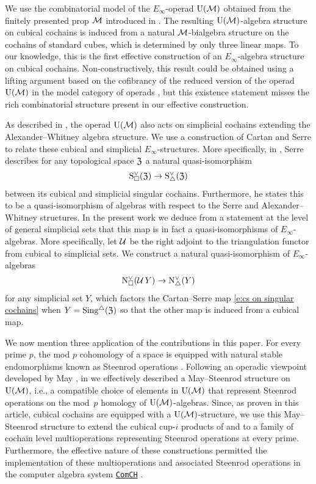 We use the combinatorial model of the $E_\infty$-operad ${\operatorname{U}(\mathcal{M})}$ obtained from the finitely presented prop $\mathcal{M}$ introduced in \cite{medina2020prop1}.
The resulting ${\operatorname{U}(\mathcal{M})}$-algebra structure on cubical cochains is induced from a natural $\mathcal{M}$-bialgebra structure on the cochains of standard cubes, which is determined by only three linear maps.
To our knowledge, this is the first effective construction of an $E_\infty$-algebra structure on cubical cochains.
Non-constructively, this result could be obtained using a lifting argument based on the cofibrancy of the reduced version of the operad ${\operatorname{U}(\mathcal{M})}$ in the model category of operads \cite{hinich1997homological, berger2003modelcategory}, but this existence statement misses the rich combinatorial structure present in our effective construction.

As described in \cite{medina2020prop1}, the operad ${\operatorname{U}(\mathcal{M})}$ also acts on simplicial cochains extending the Alexander--Whitney algebra structure.
We use a construction of Cartan and Serre to relate these cubical and simplicial $E_\infty$-structures.
More specifically, in \cite[p. 442]{serre1951homologie}, Serre describes for any topological space $\mathfrak{Z}$ a natural quasi-isomorphism
\begin{equation} \label{e:cs on singular cochains}
	\operatorname{S^{\vee}_{\square}}(\mathfrak{Z}) \to \operatorname{S^{\vee}_{\triangle}}(\mathfrak{Z})
\end{equation}
between its cubical and simplicial singular cochains.
Furthermore, he states this to be a quasi-isomorphism of algebras with respect to the Serre and Alexander--Whitney structures.
In the present work we deduce from a statement at the level of general simplicial sets that this map is in fact a quasi-isomorphisms of $E_\infty$-algebras.
More specifically, let $\operatorname{\mathcal{U}}$ be the right adjoint to the triangulation functor from cubical to simplicial sets.
We construct a natural quasi-isomorphism of $E_\infty$-algebras
\[
\operatorname{N^{\vee}_{\square}}(\operatorname{\mathcal{U}} Y) \to \operatorname{N^{\vee}_{\triangle}}(Y)
\]
for any simplicial set $Y$, which factors the Cartan--Serre map \eqref{e:cs on singular cochains} when $Y = \operatorname{Sing^{\triangle}}(\mathfrak{Z})$ so that the other map is induced from a cubical map.

We now mention three application of the contributions in this paper.
For every prime $p$, the mod $p$ cohomology of a space is equipped with natural stable endomorphisms known as Steenrod operations \cite{steenrod1962cohomology}.
Following an operadic viewpoint developed by May \cite{may1970general}, in \cite{medina2021may_st} we effectively described a May--Steenrod structure on ${\operatorname{U}(\mathcal{M})}$, i.e., a compatible choice of elements in ${\operatorname{U}(\mathcal{M})}$ that represent Steenrod operations on the mod~$p$ homology of ${\operatorname{U}(\mathcal{M})}$-algebras.
Since, as proven in this article, cubical cochains are equipped with a ${\operatorname{U}(\mathcal{M})}$-structure, we use this May--Steenrod structure to extend the cubical cup-$i$ products of \cite{kadeishvili1999coproducts} and \cite{pilarczyk2016cubical} to a family of cochain level multioperations representing Steenrod operations at every prime.
Furthermore, the effective nature of these constructions permitted the implementation of these multioperations and associated Steenrod operations in the computer algebra system \href{https://comch.readthedocs.io/en/latest/}{\texttt{ComCH}} \cite{medina2021comch}.

